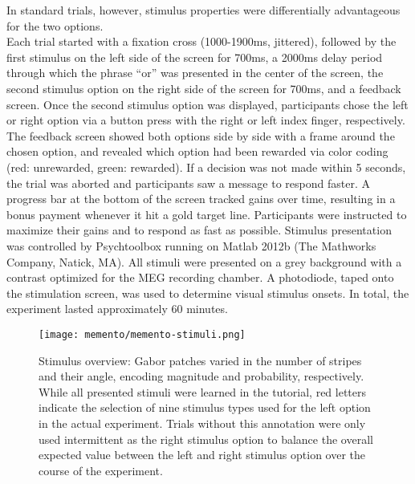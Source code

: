 In standard trials, however, stimulus properties were differentially advantageous for the two options.\\
Each trial started with a fixation cross (1000-1900ms, jittered), followed by the first stimulus on the left side of the screen for 700ms, a 2000ms delay period through which the phrase ``or'' was presented in the center of the screen, the second stimulus option on the right side of the screen for 700ms, and a feedback screen.
Once the second stimulus option was displayed, participants chose the left or right option via a button press with the right or left index finger, respectively.
The feedback screen showed both options side by side with a frame around the chosen option, and revealed which option had been rewarded via color coding (red: unrewarded, green: rewarded).
If a decision was not made within 5 seconds, the trial was aborted and participants saw a message to respond faster.
A progress bar at the bottom of the screen tracked gains over time, resulting in a bonus payment whenever it hit a gold target line.
Participants were instructed to maximize their gains and to respond as fast as possible.
Stimulus presentation was controlled by Psychtoolbox \citep{kleiner2007s} running on Matlab 2012b (The Mathworks Company, Natick, MA).
All stimuli were presented on a grey background with a contrast optimized for the MEG recording chamber.
A photodiode, taped onto the stimulation screen, was used to determine visual stimulus onsets.
In total, the experiment lasted approximately 60 minutes.

\begin{figure}
	\centering
	\texttt{[image: memento/memento-stimuli.png]}
	\caption[Stimulus overview]{Stimulus overview: Gabor patches varied in the number of stripes and their angle, encoding magnitude and probability, respectively. While all presented stimuli were learned in the tutorial, red letters indicate the selection of nine stimulus types used for the left option in the actual experiment. Trials without this annotation were only used intermittent as the right stimulus option to balance the overall expected value between the left and right stimulus option over the course of the experiment.}
	\label{fig:memento_stim}
\end{figure}

